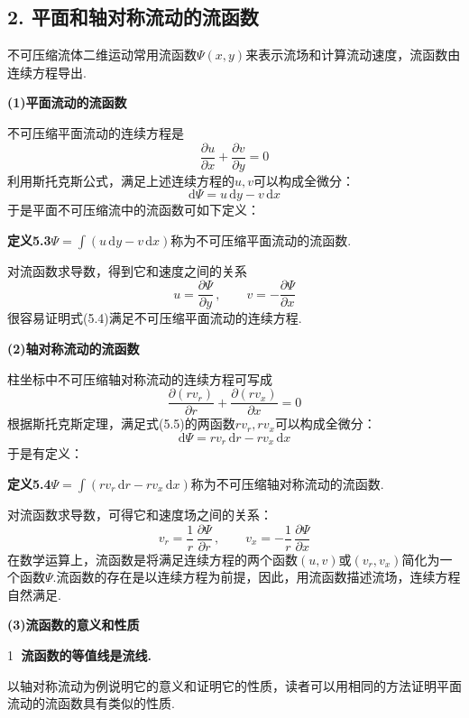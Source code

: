 \subsection*{2. 平面和轴对称流动的流函数}

不可压缩流体二维运动常用流函数$\Psi(x,y)$来表示流场和计算流动速度，流函数由连续方程导出.

\textbf{(1)平面流动的流函数}

不可压缩平面流动的连续方程是
\[
\frac{\partial u}{\partial x}+\frac{\partial v}{\partial y}=0
\]
利用斯托克斯公式，满足上述连续方程的$u,v$可以构成全微分：
\[
\mathrm{d}\Psi=u\,\mathrm{d}y-v\,\mathrm{d}x
\]
于是平面不可压缩流中的流函数可如下定义：

\noindent\textbf{定义5.3}\quad $\Psi=\displaystyle\int( u\,\mathrm{d}y-v\,\mathrm{d}x)$称为不可压缩平面流动的流函数.

对流函数求导数，得到它和速度之间的关系
\begin{equation*}
u=\frac{\partial\Psi}{\partial y}\,,\qquad v=-\frac{\partial\Psi}{\partial x}
\tag{5.4}
\end{equation*}
很容易证明式(5.4)满足不可压缩平面流动的连续方程.

\textbf{(2)轴对称流动的流函数}

柱坐标中不可压缩轴对称流动的连续方程可写成
\begin{equation*}
\frac{\partial(rv_r)}{\partial r}+\frac{\partial(rv_x)}{\partial x}=0
\tag{5.5}
\end{equation*}
根据斯托克斯定理，满足式(5.5)的两函数$rv_r,rv_x$可以构成全微分：
\[
\mathrm{d}\Psi=rv_r\,\mathrm{d}r-rv_x\,\mathrm{d}x
\]
于是有定义：

\noindent\textbf{定义5.4}\quad $\Psi=\displaystyle\int( rv_r\,\mathrm{d}r-rv_x\,\mathrm{d}x)$称为不可压缩轴对称流动的流函数.

对流函数求导数，可得它和速度场之间的关系：
\begin{equation*}
v_r=\frac{1}{r}\,\frac{\partial\Psi}{\partial r}\,,\qquad v_x=-\frac{1}{r}\,\frac{\partial\Psi}{\partial x}
\tag{5.6}
\end{equation*}
在数学运算上，流函数是将满足连续方程的两个函数$(u,v)$或$(v_r,v_x)$简化为一个函数$\Psi$.流函数的存在是以连续方程为前提，因此，用流函数描述流场，连续方程自然满足.

\textbf{(3)流函数的意义和性质}

\textcircled{1} \textbf{流函数的等值线是流线.}

以轴对称流动为例说明它的意义和证明它的性质，读者可以用相同的方法证明平面流动的流函数具有类似的性质.

